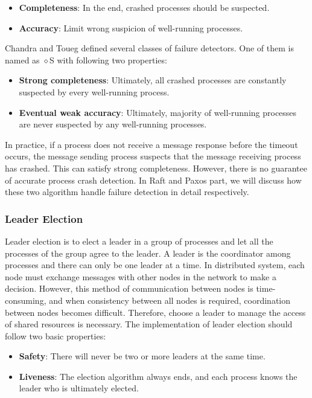 \documentclass[12pt, a4paper]{article}
\begin{document}
\begin{itemize}
  \item \textbf{Completeness}: In the end, crashed processes should be 
  suspected. 
  \item \textbf{Accuracy}: Limit wrong suspicion of well-running processes. 
\end{itemize}

Chandra and Toueg\cite{chandra1996unreliable} defined several classes of failure 
detectors. One of them is named as $\diamond$S with following two properties:

\begin{itemize}
  \item \textbf{Strong completeness}: Ultimately, all crashed processes are 
  constantly suspected by every well-running process.
  \item \textbf{Eventual weak accuracy}: Ultimately, majority of well-running 
  processes are never suspected by any well-running processes.
\end{itemize}

In practice, if a process does not receive a message response before the timeout occurs, the message sending process suspects that the message receiving process has crashed. This can satisfy strong completeness. However, there is no guarantee of accurate process crash detection. In Raft and Paxos part, we will discuss how these two algorithm handle failure detection in detail respectively.

\subsubsection{Leader Election}

Leader election is to elect a leader in a group of processes and let all the processes of the group agree to the leader. A leader is the coordinator among processes and there can only be one leader at a time. In distributed system, each node must exchange messages with other nodes in the network to make a decision. However, this method of communication between nodes is time-consuming, and when consistency between all nodes is required, coordination between nodes becomes difficult. Therefore, choose a leader to manage the access of shared resources is necessary. The implementation of leader election should follow two basic properties\cite{nugraheni2009formal}:

\begin{itemize}
  \item \textbf{Safety}: There will never be two or more leaders at the same 
  time.
  \item \textbf{Liveness}: The election algorithm always ends, and each process 
  knows the leader who is ultimately elected.
\end{itemize}
\end{document}
